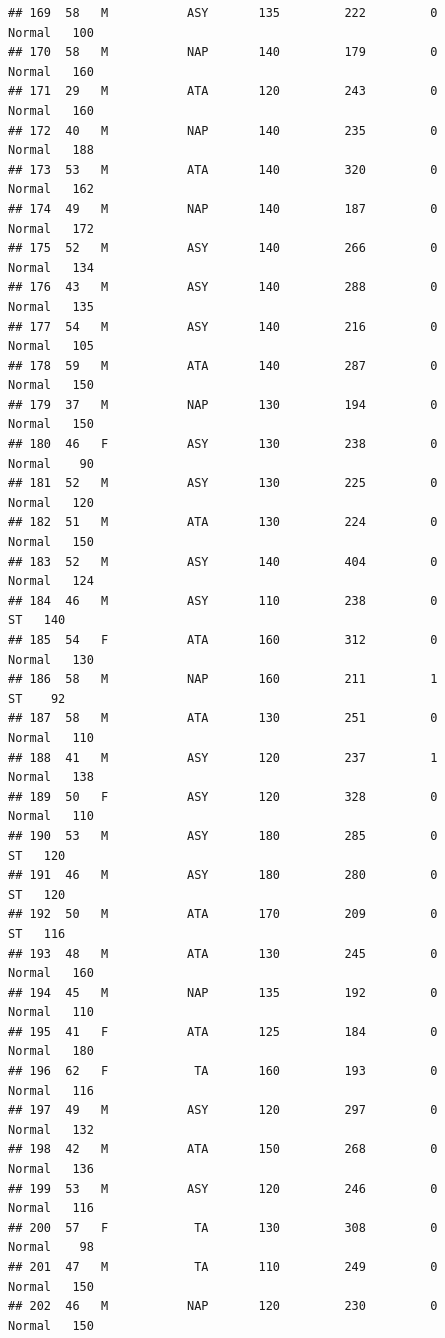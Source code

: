 \documentclass[
]{article}
\begin{document}
\begin{verbatim}
## 169  58   M           ASY       135         222         0     Normal   100
## 170  58   M           NAP       140         179         0     Normal   160
## 171  29   M           ATA       120         243         0     Normal   160
## 172  40   M           NAP       140         235         0     Normal   188
## 173  53   M           ATA       140         320         0     Normal   162
## 174  49   M           NAP       140         187         0     Normal   172
## 175  52   M           ASY       140         266         0     Normal   134
## 176  43   M           ASY       140         288         0     Normal   135
## 177  54   M           ASY       140         216         0     Normal   105
## 178  59   M           ATA       140         287         0     Normal   150
## 179  37   M           NAP       130         194         0     Normal   150
## 180  46   F           ASY       130         238         0     Normal    90
## 181  52   M           ASY       130         225         0     Normal   120
## 182  51   M           ATA       130         224         0     Normal   150
## 183  52   M           ASY       140         404         0     Normal   124
## 184  46   M           ASY       110         238         0         ST   140
## 185  54   F           ATA       160         312         0     Normal   130
## 186  58   M           NAP       160         211         1         ST    92
## 187  58   M           ATA       130         251         0     Normal   110
## 188  41   M           ASY       120         237         1     Normal   138
## 189  50   F           ASY       120         328         0     Normal   110
## 190  53   M           ASY       180         285         0         ST   120
## 191  46   M           ASY       180         280         0         ST   120
## 192  50   M           ATA       170         209         0         ST   116
## 193  48   M           ATA       130         245         0     Normal   160
## 194  45   M           NAP       135         192         0     Normal   110
## 195  41   F           ATA       125         184         0     Normal   180
## 196  62   F            TA       160         193         0     Normal   116
## 197  49   M           ASY       120         297         0     Normal   132
## 198  42   M           ATA       150         268         0     Normal   136
## 199  53   M           ASY       120         246         0     Normal   116
## 200  57   F            TA       130         308         0     Normal    98
## 201  47   M            TA       110         249         0     Normal   150
## 202  46   M           NAP       120         230         0     Normal   150

\end{verbatim}
\end{document}
